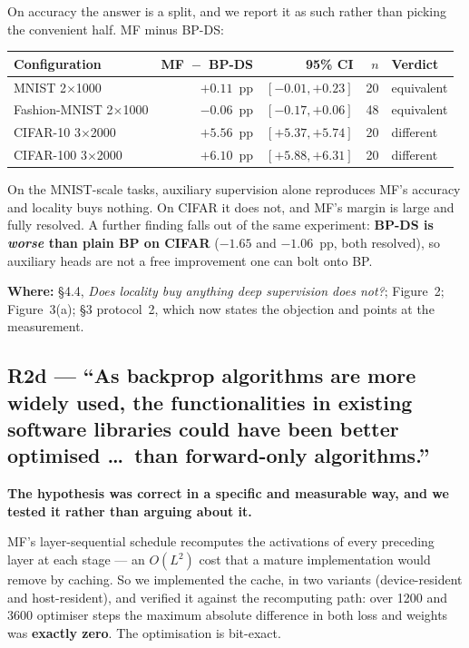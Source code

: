 \documentclass[11pt,a4paper]{article}
\newcommand{\MF}{MF}
\newcommand{\BP}{BP}
\newcommand{\BPDS}{BP-DS}
\newcommand{\where}[1]{\par\smallskip\noindent\textbf{Where:} #1\par}
\begin{document}
On accuracy the answer is a split, and we report it as such rather than
picking the convenient half. \MF{} minus \BPDS{}:

\begin{center}\small
\begin{tabular}{lrrrl}
\toprule
Configuration & \MF{}~$-$~\BPDS{} & 95\% CI & $n$ & Verdict \\
\midrule
MNIST 2$\times$1000          & $+0.11$~pp & $[-0.01, +0.23]$ & 20 & equivalent \\
Fashion-MNIST 2$\times$1000  & $-0.06$~pp & $[-0.17, +0.06]$ & 48 & equivalent \\
CIFAR-10 3$\times$2000       & $+5.56$~pp & $[+5.37, +5.74]$ & 20 & different \\
CIFAR-100 3$\times$2000      & $+6.10$~pp & $[+5.88, +6.31]$ & 20 & different \\
\bottomrule
\end{tabular}
\end{center}

On the MNIST-scale tasks, auxiliary supervision alone reproduces \MF{}'s
accuracy and locality buys nothing. On CIFAR it does not, and \MF{}'s margin
is large and fully resolved. A further finding falls out of the same
experiment: \textbf{\BPDS{} is \emph{worse} than plain \BP{} on CIFAR}
($-\num{1.65}$ and $-\num{1.06}$~pp, both resolved), so auxiliary heads are
not a free improvement one can bolt onto \BP{}.

\where{\S4.4, \emph{Does locality buy anything deep supervision does not?};
Figure~2; Figure~3(a); \S3 protocol~2, which now states the objection and
points at the measurement.}

\subsection*{R2d --- ``As backprop algorithms are more widely used, the
functionalities in existing software libraries could have been better
optimised \dots\ than forward-only algorithms.''}

\textbf{The hypothesis was correct in a specific and measurable way, and we
tested it rather than arguing about it.}

\MF{}'s layer-sequential schedule recomputes the activations of every
preceding layer at each stage --- an $O(L^2)$ cost that a mature
implementation would remove by caching. So we implemented the cache, in two
variants (device-resident and host-resident), and verified it against the
recomputing path: over \num{1200} and \num{3600} optimiser steps the maximum
absolute difference in both loss and weights was \textbf{exactly zero}. The
optimisation is bit-exact.
\end{document}
